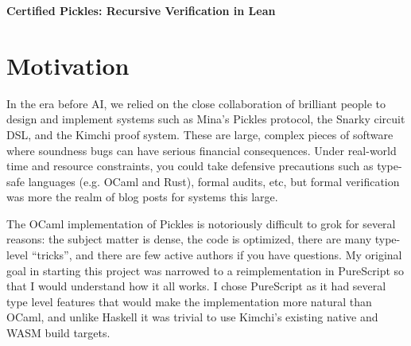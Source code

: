 \documentclass[11pt,a4paper]{article}
\theoremstyle{definition}
\theoremstyle{insetstatement}
\begin{document}
\begin{center}
  {\large\bfseries Certified Pickles: Recursive Verification in Lean}
\end{center}

\begin{abstract}
We present a \href{https://github.com/l-adic/snarky/tree/main/formal}{Lean formalization}
of the recursive verification circuits
originally defined in the OCaml framework Pickles. The Lean circuits
implementing the embedded verifier are proven sound: for a given set of
rules, the circuits correctly carry and fulfill proof obligations through
iterated Step/Wrap cycles. Additionally, we provide a provably sound Snarky
compiler in Lean targeting Kimchi constraints, and a method to ``lift and recompile''
any foreign-defined Pickles applications. We use these results to write an executable
that reconstruct and certify Pickles applications defined outside Lean.
We apply this method to prove the soundness of the original OCaml applications as
well as applications written in a novel PureScript implementation.
The soundness of Kimchi itself is assumed.
\end{abstract}

\tableofcontents
\clearpage

\section{Motivation}
\label{sec:motivation}

In the era before AI, we relied on the close collaboration of brilliant people to design and
implement systems such as Mina's Pickles protocol, the Snarky circuit DSL, and the Kimchi proof
system. These are large, complex pieces of software where soundness bugs can have serious
financial consequences. Under real-world time and resource constraints, you could take defensive
precautions such as type-safe languages (e.g. OCaml and Rust), formal audits, etc, but formal
verification was more the realm of blog posts for systems this large.

The OCaml implementation of Pickles is notoriously difficult to grok for several reasons: the
subject matter is dense, the code is optimized, there are many type-level ``tricks'', and there are
few active authors if you have questions. My original goal in starting this project was narrowed
to a reimplementation in PureScript so that I would understand how it all works. I chose PureScript
as it had several type level features that would make the implementation more natural than OCaml,
and unlike Haskell it was trivial to use Kimchi's existing native and WASM build targets.
\end{document}
